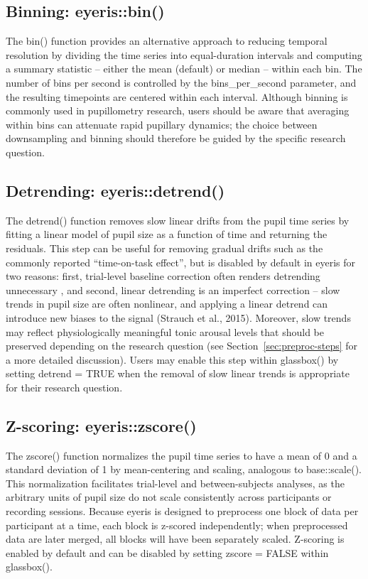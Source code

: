 \subsection{Binning: eyeris::bin()}
The bin() function provides an alternative approach to reducing temporal resolution by dividing the time series into equal-duration intervals and computing a summary statistic – either the mean (default) or median – within each bin. The number of bins per second is controlled by the bins\_per\_second parameter, and the resulting timepoints are centered within each interval. Although binning is commonly used in pupillometry research, users should be aware that averaging within bins can attenuate rapid pupillary dynamics; the choice between downsampling and binning should therefore be guided by the specific research question.

\subsection{Detrending: eyeris::detrend()}
The detrend() function removes slow linear drifts from the pupil time series by fitting a linear model of pupil size as a function of time and returning the residuals. This step can be useful for removing gradual drifts such as the commonly reported “time-on-task effect”, but is disabled by default in eyeris for two reasons: first, trial-level baseline correction often renders detrending unnecessary \parencite[see][for a detailed discussion of the tradeoffs between subtractive and divisive baseline correction approaches]{mathot2018safe}, and second, linear detrending is an imperfect correction – slow trends in pupil size are often nonlinear, and applying a linear detrend can introduce new biases to the signal (Strauch et al., 2015). Moreover, slow trends may reflect physiologically meaningful tonic arousal levels that should be preserved depending on the research question (see Section~\ref{sec:preproc-steps} for a more detailed discussion). Users may enable this step within glassbox() by setting detrend = TRUE when the removal of slow linear trends is appropriate for their research question.

\subsection{Z-scoring: eyeris::zscore()}
The zscore() function normalizes the pupil time series to have a mean of 0 and a standard deviation of 1 by mean-centering and scaling, analogous to base::scale(). This normalization facilitates trial-level and between-subjects analyses, as the arbitrary units of pupil size do not scale consistently across participants or recording sessions. Because eyeris is designed to preprocess one block of data per participant at a time, each block is z-scored independently; when preprocessed data are later merged, all blocks will have been separately scaled. Z-scoring is enabled by default and can be disabled by setting zscore = FALSE within glassbox().

